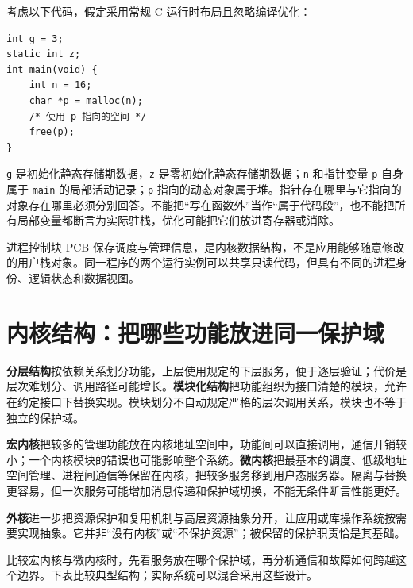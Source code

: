考虑以下代码，假定采用常规 C 运行时布局且忽略编译优化：

\par\medskip\noindent
\begin{minipage}{\linewidth}
\begin{verbatim}
int g = 3;
static int z;
int main(void) {
    int n = 16;
    char *p = malloc(n);
    /* 使用 p 指向的空间 */
    free(p);
}
\end{verbatim}
\end{minipage}\par\medskip

\texttt{g} 是初始化静态存储期数据，\texttt{z} 是零初始化静态存储期数据；\texttt{n} 和指针变量 \texttt{p} 自身属于 \texttt{main} 的局部活动记录；\texttt{p} 指向的动态对象属于堆。指针存在哪里与它指向的对象存在哪里必须分别回答。不能把``写在函数外''当作``属于代码段''，也不能把所有局部变量都断言为实际驻栈，优化可能把它们放进寄存器或消除。

进程控制块 PCB 保存调度与管理信息，是内核数据结构，不是应用能够随意修改的用户栈对象。同一程序的两个运行实例可以共享只读代码，但具有不同的进程身份、逻辑状态和数据视图。

\section{内核结构：把哪些功能放进同一保护域}\label{os-1-8}

\textbf{分层结构}按依赖关系划分功能，上层使用规定的下层服务，便于逐层验证；代价是层次难划分、调用路径可能增长。\textbf{模块化结构}把功能组织为接口清楚的模块，允许在约定接口下替换实现。模块划分不自动规定严格的层次调用关系，模块也不等于独立的保护域。

\textbf{宏内核}把较多的管理功能放在内核地址空间中，功能间可以直接调用，通信开销较小；一个内核模块的错误也可能影响整个系统。\textbf{微内核}把最基本的调度、低级地址空间管理、进程间通信等保留在内核，把较多服务移到用户态服务器。隔离与替换更容易，但一次服务可能增加消息传递和保护域切换，不能无条件断言性能更好。

\textbf{外核}进一步把资源保护和复用机制与高层资源抽象分开，让应用或库操作系统按需要实现抽象。它并非``没有内核''或``不保护资源''；被保留的保护职责恰是其基础。

比较宏内核与微内核时，先看服务放在哪个保护域，再分析通信和故障如何跨越这个边界。下表比较典型结构；实际系统可以混合采用这些设计。

